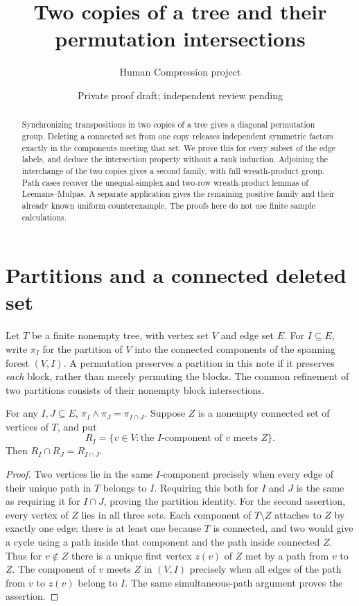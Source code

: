 \documentclass[a4paper,11pt]{article}
\title{Two copies of a tree and their permutation intersections}
\author{Human Compression project}\date{Private proof draft; independent review pending}
\begin{document}
\maketitle
\begin{abstract}
Synchronizing transpositions in two copies of a tree gives a diagonal
permutation group. Deleting a connected set from one copy releases independent
symmetric factors exactly in the components meeting that set. We prove this
for every subset of the edge labels, and deduce the intersection property
without a rank induction. Adjoining the interchange of the two copies gives
a second family, with full wreath-product group. Path cases recover the unequal-simplex and two-row wreath-product lemmas of
Leemans--Mulpas. A separate application gives the remaining positive family
and their already known uniform counterexample. The proofs here do not use
finite sample calculations.
\end{abstract}

\section{Partitions and a connected deleted set}
Let $T$ be a finite nonempty tree, with vertex set $V$ and edge set $E$.
For $I\subseteq E$, write $\pi_I$ for the partition of $V$ into the connected
components of the spanning forest $(V,I)$. A permutation preserves a partition
in this note if it preserves \emph{each} block, rather than merely permuting
the blocks. The common refinement of two partitions consists of their nonempty
block intersections.

\begin{lemma}\label{lem:paths}
For any $I,J\subseteq E$,
$\pi_I\wedge\pi_J=\pi_{I\cap J}$.
Suppose $Z$ is a nonempty connected set of vertices of $T$, and put
\[
 R_I=\{v\in V:\text{the $I$-component of $v$ meets $Z$}\}.
\]
Then $R_I\cap R_J=R_{I\cap J}$.
\end{lemma}
\begin{proof}
Two vertices lie in the same $I$-component precisely when every edge of their
unique path in $T$ belongs to $I$. Requiring this both for $I$ and $J$ is the
same as requiring it for $I\cap J$, proving the partition identity.
For the second assertion, every vertex of $Z$ lies in all three sets.
Each component of $T\setminus Z$ attaches to $Z$ by exactly one edge:
there is at least one because $T$ is connected, and two would give a cycle
using a path inside that component and the path inside connected $Z$.
Thus for $v\notin Z$ there is a unique first vertex $z(v)$ of $Z$ met by a
path from $v$ to $Z$. The component of $v$ meets $Z$ in $(V,I)$ precisely
when all edges of the path from $v$ to $z(v)$ belong to $I$.
The same simultaneous-path argument proves the assertion.
\end{proof}
\end{document}

